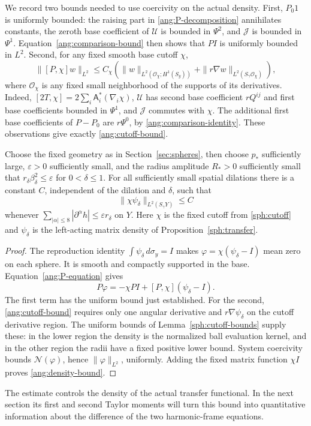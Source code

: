 We record two bounds needed to use coercivity on the actual density.
First, $P_0 1$ is uniformly bounded: the raising part in
\eqref{ang:P-decomposition} annihilates constants, the zeroth base
coefficient of $\mathcal U$ is bounded in $\Psi^2$, and $\mathcal J$ is bounded in
$\Psi^1$.  Equation~\eqref{ang:comparison-bound} then shows that
$PI$ is uniformly bounded in $L^2$.
Second, for any fixed smooth base cutoff $\chi$,
\begin{equation}\label{ang:cutoff-bound}
 \|[P,\chi]w\|_{L^2}
 \le C_\chi\left(
   \|w\|_{L^2(\mathcal O_\chi;H^1(S_y))}
             +\|r\nabla w\|_{L^2(S_\gamma\mathcal O_\chi)}\right),
\end{equation}
where $\mathcal O_\chi$ is any fixed small neighborhood of the supports
of its derivatives.  Indeed,
$[2T,\chi]=2\sum_i\mathsf A_i^*(\nabla_i\chi)$,
$\mathcal U$ has second base coefficient $rQ^{ij}$ and first base coefficients
bounded in $\Psi^1$, and $\mathcal J$ commutes with $\chi$.
The additional first base coefficients of $P-P_0$ are $r\Psi^0$,
by \eqref{ang:comparison-identity}.  These observations give exactly
\eqref{ang:cutoff-bound}.

\begin{proposition}\label{ang:density}
Choose the fixed geometry as in Section~\ref{sec:spheres}, then choose
$p_*$ sufficiently large, $\varepsilon>0$ sufficiently small, and the
radius amplitude $R_*>0$ sufficiently small that
$r_\delta\beta_\delta^2\le\varepsilon$ for $0<\delta\le1$.
For all sufficiently small spatial dilations there is a constant $C$,
independent of the dilation and $\delta$, such that
\begin{equation}\label{ang:density-bound}
 \|\chi\psi_\delta\|_{L^2(S_\gamma Y)}\le C
\end{equation}
whenever $\sum_{|\alpha|\le8}|\partial^\alpha h|
\le\varepsilon r_\delta$ on $Y$.
Here $\chi$ is the fixed cutoff from \eqref{sph:cutoff} and
$\psi_\delta$ is the left-acting matrix density of
Proposition~\ref{sph:transfer}.
\end{proposition}

\begin{proof}
The reproduction identity $\int\psi_\delta\,d\sigma_y=I$ makes
$\varphi=\chi(\psi_\delta-I)$ mean zero on each sphere.  It is smooth
and compactly supported in the base.  Equation~\eqref{ang:P-equation}
gives
\[
 P\varphi=-\chi PI+[P,\chi](\psi_\delta-I).
\]
The first term has the uniform bound just established.  For the second,
\eqref{ang:cutoff-bound} requires only one angular derivative and
$r\nabla\psi_\delta$ on the cutoff derivative region.
The uniform bounds of Lemma~\ref{sph:cutoff-bounds} supply these:
in the lower region the density is the normalized ball evaluation
kernel, and in the other region the radii have a fixed positive lower
bound.  System coercivity bounds $\mathcal N(\varphi)$, hence
$\|\varphi\|_{L^2}$, uniformly.  Adding the fixed matrix function
$\chi I$ proves \eqref{ang:density-bound}.
\end{proof}

The estimate controls the density of the actual transfer functional.
In the next section its first and second Taylor moments will turn this
bound into quantitative information about the difference of the two
harmonic-frame equations.
